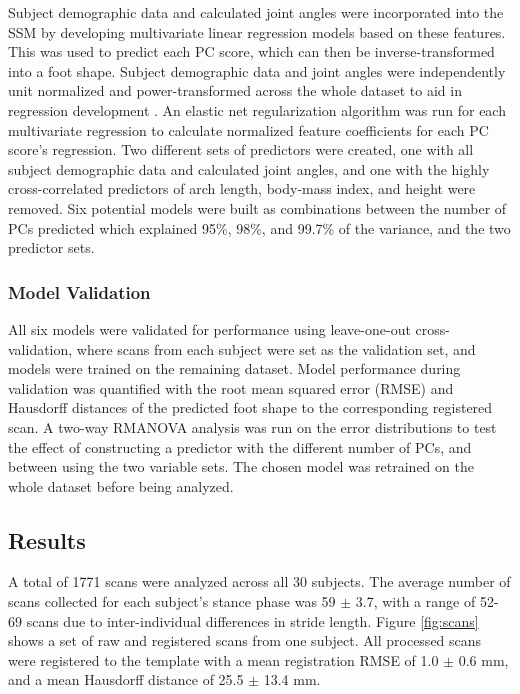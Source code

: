 \documentclass[defaultstyle,11pt]{comps}
\begin{document}
Subject demographic data and calculated joint angles were incorporated into the SSM by developing multivariate linear regression models based on these features.
This was used to predict each PC score, which can then be inverse-transformed into a foot shape.
Subject demographic data and joint angles were independently unit normalized and power-transformed across the whole dataset to aid in regression development \citep{Yeo2000}.
An elastic net regularization algorithm \citep{Zou2005} was run for each multivariate regression to calculate normalized feature coefficients for each PC score's regression.
Two different sets of predictors were created, one with all subject demographic data and calculated joint angles, and one with the highly cross-correlated predictors of arch length, body-mass index, and height were removed.
Six potential models were built as combinations between the number of PCs predicted which explained 95\%, 98\%, and 99.7\% of the variance, and the two predictor sets.

\hypertarget{model-validation}{%
\subsubsection{Model Validation}\label{model-validation}}

All six models were validated for performance using leave-one-out cross-validation, where scans from each subject were set as the validation set, and models were trained on the remaining dataset.
Model performance during validation was quantified with the root mean squared error (RMSE) and Hausdorff distances of the predicted foot shape to the corresponding registered scan.
A two-way RMANOVA analysis was run on the error distributions to test the effect of constructing a predictor with the different number of PCs, and between using the two variable sets.
The chosen model was retrained on the whole dataset before being analyzed.

\hypertarget{results-1}{%
\subsection{Results}\label{results-1}}

A total of 1771 scans were analyzed across all 30 subjects.
The average number of scans collected for each subject's stance phase was 59 \(\pm\) 3.7, with a range of 52-69 scans due to inter-individual differences in stride length.
Figure \ref{fig:scans} shows a set of raw and registered scans from one subject.
All processed scans were registered to the template with a mean registration RMSE of 1.0 \(\pm\) 0.6 mm, and a mean Hausdorff distance of 25.5 \(\pm\) 13.4 mm.
\end{document}
